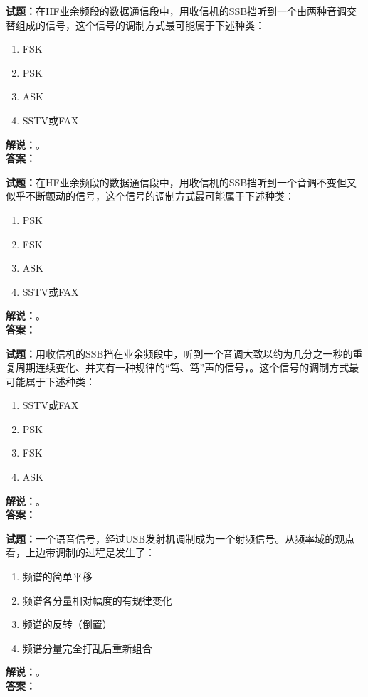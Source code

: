 \documentclass{ctexbook}
\begin{document}
\vspace{\baselineskip}

\noindent\textbf{试题：}在HF业余频段的数据通信段中，用收信机的SSB挡听到一个由两种音调交替组成的信号，这个信号的调制方式最可能属于下述种类：
\begin{enumerate}[leftmargin=3em]
  \item FSK
  \item PSK
  \item ASK
  \item SSTV或FAX
\end{enumerate}
\noindent\textbf{解说：}\textbf{}。\\\noindent\textbf{答案：}

\vspace{\baselineskip}

\noindent\textbf{试题：}在HF业余频段的数据通信段中，用收信机的SSB挡听到一个音调不变但又似乎不断颤动的信号，这个信号的调制方式最可能属于下述种类：
\begin{enumerate}[leftmargin=3em]
  \item PSK
  \item FSK
  \item ASK
  \item SSTV或FAX
\end{enumerate}
\noindent\textbf{解说：}\textbf{}。\\\noindent\textbf{答案：}

\vspace{\baselineskip}

\noindent\textbf{试题：}用收信机的SSB挡在业余频段中，听到一个音调大致以约为几分之一秒的重复周期连续变化、并夹有一种规律的“笃、笃”声的信号，。这个信号的调制方式最可能属于下述种类：
\begin{enumerate}[leftmargin=3em]
  \item SSTV或FAX
  \item PSK
  \item FSK
  \item ASK
\end{enumerate}
\noindent\textbf{解说：}\textbf{}。\\\noindent\textbf{答案：}

\vspace{\baselineskip}

\noindent\textbf{试题：}一个语音信号，经过USB发射机调制成为一个射频信号。从频率域的观点看，上边带调制的过程是发生了：
\begin{enumerate}[leftmargin=3em]
  \item 频谱的简单平移
  \item 频谱各分量相对幅度的有规律变化
  \item 频谱的反转（倒置）
  \item 频谱分量完全打乱后重新组合
\end{enumerate}
\noindent\textbf{解说：}\textbf{}。\\\noindent\textbf{答案：}
\end{document}

